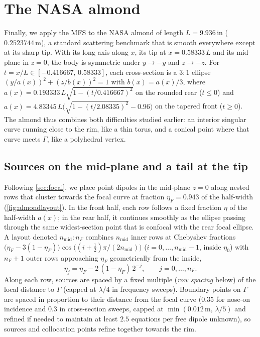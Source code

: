 \section{The NASA almond}
\label{sec:almond}

Finally, we apply the MFS to the NASA almond \cite{woo1993,kelley2020} of length $L = 9.936$\,in ($0.2523744$\,m), a standard scattering benchmark that is smooth everywhere except at its sharp tip. With its long axis along $x$, its tip at $x = 0.58333\,L$ and its mid-plane in $z = 0$, the body is symmetric under $y\to-y$ and $z\to-z$. For $t = x/L \in [-0.416667,\,0.58333]$, each cross-section is a $3{:}1$ ellipse $(y/a(x))^2 + (z/b(x))^2 = 1$ with $b(x) = a(x)/3$, where $a(x) = 0.193333\,L\allowbreak\sqrt{1-(t/0.416667)^2}$ on the rounded rear ($t\le0$) and $a(x) = 4.83345\,L\allowbreak\bigl(\sqrt{1-(t/2.08335)^2}-0.96\bigr)$ on the tapered front ($t\ge0$). The almond thus combines both difficulties studied earlier: an interior singular curve running close to the rim, like a thin torus, and a conical point where that curve meets $\Gamma$, like a polyhedral vertex.

\subsection{Sources on the mid-plane and a tail at the tip}

Following \autoref{sec:focal}, we place point dipoles in the mid-plane $z = 0$ along nested rows that cluster towards the focal curve at fraction $\eta_F = 0.943$ of the half-width (\autoref{fig:almondlayout}). In the front half, each row follows a fixed fraction $\eta$ of the half-width $a(x)$; in the rear half, it continues smoothly as the ellipse passing through the same widest-section point that is confocal with the rear focal ellipse. A layout denoted $n_{\mathrm{mid}}{:}n_F$ combines $n_{\mathrm{mid}}$ inner rows at Chebyshev fractions $\bigl(\eta_F - 3(1-\eta_F)\bigr)\cos\bigl((i+\tfrac12)\pi/(2n_{\mathrm{mid}})\bigr)$ ($i = 0,\dots,n_{\mathrm{mid}}-1$, inside $\eta_0$) with $n_F+1$ outer rows approaching $\eta_F$ geometrically from the inside,
\begin{equation}
  \eta_j = \eta_F - 2\,(1-\eta_F)\,2^{-j}, \qquad j = 0,\dots,n_F.
\end{equation}
Along each row, sources are spaced by a fixed multiple (\emph{row spacing} below) of the local distance to $\Gamma$ (capped at $\lambda/4$ in frequency sweeps). Boundary points on $\Gamma$ are spaced in proportion to their distance from the focal curve ($0.35$ for nose-on incidence and $0.3$ in cross-section sweeps, capped at $\min(0.012\,\mathrm{m},\,\lambda/5)$ and refined if needed to maintain at least $2.5$ equations per free dipole unknown), so sources and collocation points refine together towards the rim.

